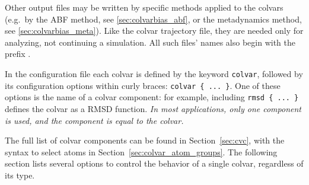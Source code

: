 Other output files may be written by specific methods applied to the colvars (e.g.~by the ABF method, see \ref{sec:colvarbias_abf}, or the metadynamics method, see \ref{sec:colvarbias_meta}).
Like the colvar trajectory file, they are needed only for analyzing, not continuing a simulation.
All such files' names also begin with the prefix \outputName\texttt{}.



\label{sec:colvar}

In the configuration file each colvar is defined by the keyword
\texttt{colvar}, followed by its configuration options within curly braces: \texttt{colvar~\{~...~\}}.  One of these options is the name of a colvar component: for example, including \texttt{rmsd \{~...~\}} defines the colvar as a RMSD function.  \emph{In most applications, only one component is used, and the component is equal to the colvar.}

The full list of colvar components can be found in Section~\ref{sec:cvc}, with the syntax to select atoms in Section~\ref{sec:colvar_atom_groups}. 
The following section lists several options to control the behavior of a single colvar, regardless of its type.

